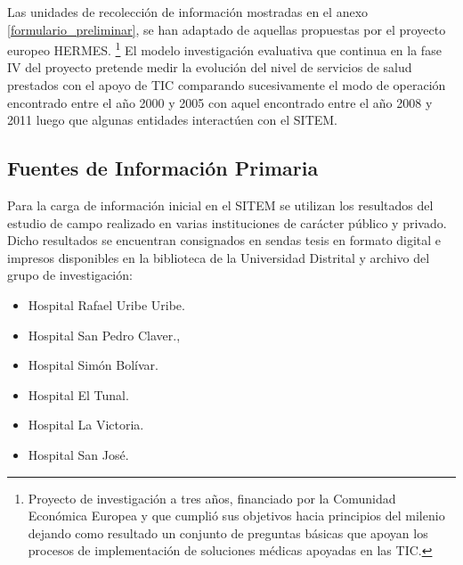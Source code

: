 Las unidades de recolección de información mostradas en el anexo \ref{formulario_preliminar}, se han adaptado de aquellas propuestas por el proyecto europeo HERMES. \footnote{Proyecto de investigación a tres años, financiado por la Comunidad Económica Europea y que cumplió sus objetivos hacia principios del milenio dejando como resultado un conjunto de preguntas básicas que apoyan los procesos de implementación de soluciones médicas apoyadas en las TIC.} El modelo investigación evaluativa que continua en la fase IV del proyecto pretende medir la evolución del nivel de servicios de salud prestados con el apoyo de TIC comparando sucesivamente el modo de operación encontrado entre el año 2000 y 2005 con aquel encontrado entre el año 2008 y 2011 luego que algunas entidades interactúen con el SITEM.

\subsection {Fuentes de Información Primaria}

Para la carga de información inicial en el SITEM se utilizan los resultados del estudio de campo realizado en varias instituciones de carácter público y privado. Dicho resultados se encuentran consignados en sendas tesis en formato digital e impresos disponibles en la biblioteca de la Universidad Distrital y archivo del grupo de investigación:

\begin{itemize}
 \item Hospital Rafael Uribe Uribe.\cite{guarin2003}
 \item Hospital San Pedro Claver.\cite{ardila2001},\cite{rozo2002}
 \item Hospital Simón Bolívar. \cite{acero2002}
 \item Hospital El Tunal. \cite{ruiz2002}\cite{duque2002}
 \item Hospital La Victoria.\cite{barrero2000}
 \item Hospital San José.\cite{gonzalez2002}
\end{itemize}